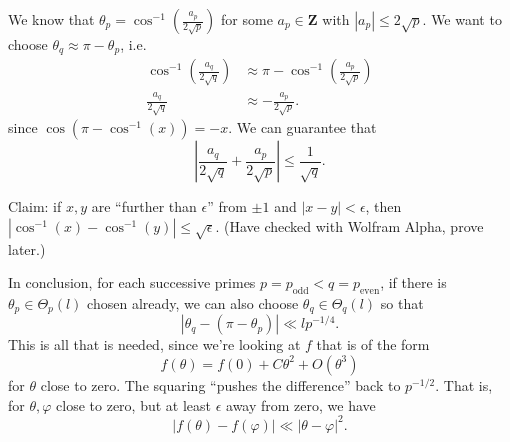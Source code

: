 \documentclass{article}
\newcommand{\bZ}{\mathbf{Z}}
\newcommand{\even}{\mathrm{even}}
\newcommand{\odd}{\mathrm{odd}}
\begin{document}
We know that $\theta_p = \cos^{-1}\left(\frac{a_p}{2\sqrt p}\right)$ for 
some $a_p\in \bZ$ with $|a_p| \leqslant 2\sqrt p$. We want to choose 
$\theta_q\approx \pi-\theta_p$, i.e.~
\begin{align*}
	\cos^{-1}\left(\frac{a_q}{2\sqrt q}\right) 
		&\approx \pi - \cos^{-1}\left(\frac{a_p}{2\sqrt p}\right) \\
	\frac{a_q}{2\sqrt q} 
		&\approx -\frac{a_p}{2\sqrt p} .
\end{align*}
since $\cos(\pi - \cos^{-1}(x)) = - x$. We can guarantee that 
\[
	\left|\frac{a_q}{2\sqrt q} + \frac{a_p}{2\sqrt p}\right| \leqslant \frac{1}{\sqrt q} .
\]

Claim: if $x,y$ are ``further than $\epsilon$'' from $\pm 1$ and 
$|x-y|<\epsilon$, then 
$|\cos^{-1}(x) - \cos^{-1}(y)| \leqslant \sqrt \epsilon$. 
(Have checked with Wolfram Alpha, prove later.)

In conclusion, for each successive primes $p=p_\odd < q=p_\even$, if there 
is $\theta_p\in \Theta_p(l)$ chosen already, we can also choose 
$\theta_q\in \Theta_q(l)$ so that 
\[
	|\theta_q - (\pi - \theta_p)| \ll l p^{-1/4} .
\]
This is all that is needed, since we're looking at $f$ that is of the form 
\[
	f(\theta) = f(0) + C \theta^2 + O(\theta^3)
\]
for $\theta$ close to zero. The squaring ``pushes the difference'' back to 
$p^{-1/2}$. That is, for $\theta,\varphi$ close to zero, but at least 
$\epsilon$ away from zero, we have 
\[
	|f(\theta) - f(\varphi)| \ll |\theta-\varphi|^2 .
\]
\end{document}
